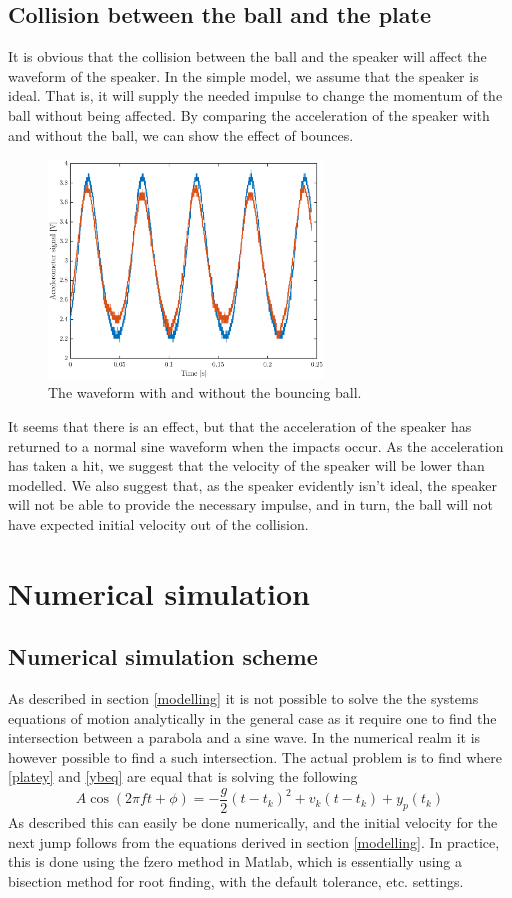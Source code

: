 \documentclass[12pt,oneside,a4paper]{article}
\numberwithin{equation}{section}
\begin{document}
{{{{\subsection{Collision between the ball and the plate}
It is obvious that the collision between the ball and the speaker will affect the waveform of the speaker. In the simple model, we assume that the speaker is ideal. That is, it will supply the needed impulse to change the momentum of the ball without being affected. By comparing the acceleration of the speaker with and without the ball, we can show the effect of bounces. 
\begin{figure}[h]
\centering
\includegraphics[width=0.65\textwidth]{ballanal.eps}
\caption{The waveform with and without the bouncing ball.}
\end{figure}
It seems that there is an effect, but that the acceleration of the speaker has returned to a normal sine waveform when the impacts occur. As the acceleration has taken a hit, we suggest that the velocity of the speaker will be lower than modelled. We also suggest that, as the speaker evidently isn't ideal, the speaker will not be able to provide the necessary impulse, and in turn, the ball will not have expected initial velocity out of the collision. 
\section{Numerical simulation}
\subsection{Numerical simulation scheme}
As described in section \ref{modelling} it is not possible to solve the the systems equations of motion analytically in the general case as it require one to find the intersection between a parabola and a sine wave. In the numerical realm it is however possible to find a such intersection. The actual problem is to find where \eqref{platey} and \eqref{ybeq} are equal that is solving the following
\begin{equation}
	A \cos(2\pi f t+ \phi) = -\frac{g}{2}(t-t_k)^2+v_k(t-t_k)+y_p(t_k)
\end{equation}
As described this can easily be done numerically, and the initial velocity for the next jump follows from the equations derived in section \ref{modelling}. In practice, this is done using the fzero method in Matlab, which is essentially using a bisection method for root finding, with the default tolerance, etc. settings.
}}}}
\end{document}
